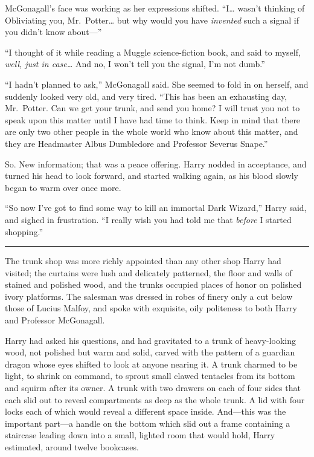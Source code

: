 McGonagall's face was working as her expressions shifted. ``I\ldots{}
wasn't thinking of Obliviating you, Mr.~Potter\ldots{} but why would you
have \emph{invented} such a signal if you didn't know about---''

``I thought of it while reading a Muggle science-fiction book, and said
to myself, \emph{well, just in case\ldots{}} And no, I won't tell you
the signal, I'm not dumb.''

``I hadn't planned to ask,'' McGonagall said. She seemed to fold in on
herself, and suddenly looked very old, and very tired. ``This has been
an exhausting day, Mr.~Potter. Can we get your trunk, and send you home?
I will trust you not to speak upon this matter until I have had time to
think. Keep in mind that there are only two other people in the whole
world who know about this matter, and they are Headmaster Albus
Dumbledore and Professor Severus Snape.''

So. New information; that was a peace offering. Harry nodded in
acceptance, and turned his head to look forward, and started walking
again, as his blood slowly began to warm over once more.

``So now I've got to find some way to kill an immortal Dark Wizard,''
Harry said, and sighed in frustration. ``I really wish you had told me
that \emph{before} I started shopping.''

\begin{center}\rule{3in}{0.4pt}\end{center}

The trunk shop was more richly appointed than any other shop Harry had
visited; the curtains were lush and delicately patterned, the floor and
walls of stained and polished wood, and the trunks occupied places of
honor on polished ivory platforms. The salesman was dressed in robes of
finery only a cut below those of Lucius Malfoy, and spoke with
exquisite, oily politeness to both Harry and Professor McGonagall.

Harry had asked his questions, and had gravitated to a trunk of
heavy-looking wood, not polished but warm and solid, carved with the
pattern of a guardian dragon whose eyes shifted to look at anyone
nearing it. A trunk charmed to be light, to shrink on command, to sprout
small clawed tentacles from its bottom and squirm after its owner. A
trunk with two drawers on each of four sides that each slid out to
reveal compartments as deep as the whole trunk. A lid with four locks
each of which would reveal a different space inside. And---this was the
important part---a handle on the bottom which slid out a frame
containing a staircase leading down into a small, lighted room that
would hold, Harry estimated, around twelve bookcases.

